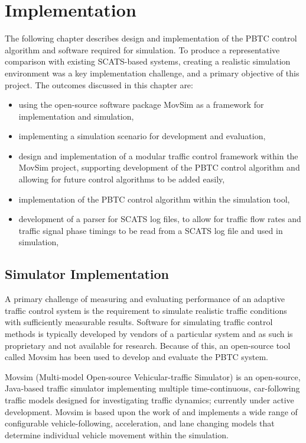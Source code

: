 \chapter{Implementation}

The following chapter describes design and implementation of the PBTC control algorithm and software required for simulation. To produce a representative comparison with existing SCATS-based systems, creating a realistic simulation environment was a key implementation challenge, and a primary objective of this project. The outcomes discussed in this chapter are:

\begin{itemize}
\item using the open-source software package MovSim as a framework for implementation and simulation,
\item implementing a simulation scenario for development and evaluation,
\item design and implementation of a modular traffic control framework within the MovSim project, supporting development of the PBTC control algorithm and allowing for future control algorithms to be added easily,
\item implementation of the PBTC control algorithm within the simulation tool,
\item development of a parser for SCATS log files, to allow for traffic flow rates and traffic signal phase timings to be read from a SCATS log file and used in simulation,
\end{itemize}

\section{Simulator Implementation}

A primary challenge of measuring and evaluating performance of an adaptive traffic control system is the requirement to simulate realistic traffic conditions with sufficiently measurable results. Software for simulating traffic control methods is typically developed by vendors of a particular system and as such is proprietary and not available for research. Because of this, an open-source tool called Movsim has been used to develop and evaluate the PBTC system. 

Movsim (Multi-model Open-source Vehicular-traffic Simulator) is an open-source, Java-based traffic simulator implementing multiple time-continuous, car-following traffic models designed for investigating traffic dynamics; currently under active development. Movsim is based upon the work of  and implements a wide range of configurable vehicle-following, acceleration, and lane changing models that determine individual vehicle movement within the simulation.

